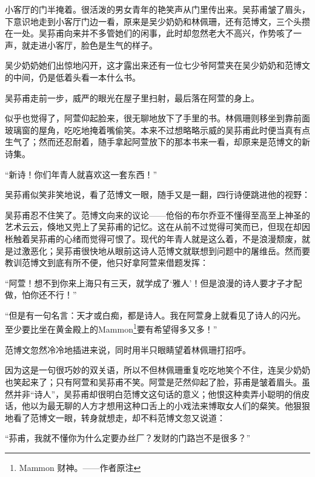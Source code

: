 \par 小客厅的门半掩着。很活泼的男女青年的艳笑声从门里传出来。吴荪甫皱了眉头，下意识地走到小客厅门边一看，原来是吴少奶奶和林佩珊，还有范博文，三个头攒在一处。吴荪甫向来并不多管她们的闲事，此时却忽然老大不高兴，作势咳了一声，就走进小客厅，脸色是生气的样子。
\par 吴少奶奶她们出惊地闪开，这才露出来还有一位七少爷阿萱夹在吴少奶奶和范博文的中间，仍是低着头看一本什么书。
\par 吴荪甫走前一步，威严的眼光在屋子里扫射，最后落在阿萱的身上。
\par 似乎也觉得了，阿萱仰起脸来，很无聊地放下了手里的书。林佩珊则移坐到靠前面玻璃窗的屋角，吃吃地掩着嘴偷笑。本来不过想略略示威的吴荪甫此时便当真有点生气了；然而还忍耐着，随手拿起阿萱放下的那本书来一看，却原来是范博文的新诗集。
\par “新诗！你们年青人就喜欢这一套东西！”
\par 吴荪甫似笑非笑地说，看了范博文一眼，随手又是一翻，四行诗便跳进他的视野：
\par 吴荪甫忍不住笑了。范博文向来的议论——伧俗的布尔乔亚不懂得至高至上神圣的艺术云云，倏地又兜上了吴荪甫的记忆。这在从前不过觉得可笑而已，但现在却因枨触着吴荪甫的心绪而觉得可恨了。现代的年青人就是这么着，不是浪漫颓废，就是过激恶化；吴荪甫很快地从眼前这诗人范博文就联想到问题中的屠维岳。然而要教训范博文到底有所不便，他只好拿阿萱来借题发挥：
\par “阿萱！想不到你来上海只有三天，就学成了‘雅人’！但是浪漫的诗人要才子才配做，怕你还不行！”
\par “但是有一句名言：天才或白痴，都是诗人。我在阿萱身上就看见了诗人的闪光。至少要比坐在黄金殿上的Mammon\footnote{Mammon 财神。——作者原注}要有希望得多又多！”
\par 范博文忽然冷冷地插进来说，同时用半只眼睛望着林佩珊打招呼。
\par 因为这是一句很巧妙的双关语，所以不但林佩珊重复吃吃地笑个不住，连吴少奶奶也笑起来了；只有阿萱和吴荪甫不笑。阿萱是茫然仰起了脸，荪甫是皱着眉头。虽然并非“诗人”，吴荪甫却很明白范博文这句话的意义；他恨这种卖弄小聪明的俏皮话，他以为最无聊的人方才想用这种口舌上的小戏法来博取女人们的粲笑。他狠狠地看了范博文一眼，转身就想走，却不料范博文忽又说道：
\par “荪甫，我就不懂你为什么定要办丝厂？发财的门路岂不是很多？”
